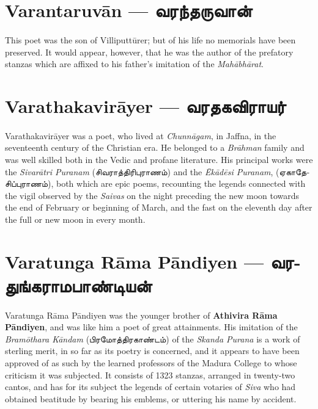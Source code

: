 \documentclass{article}
\newcommand{\TamilText}[1]{\texttamil{#1}}
\newcommand{\TamilBold}[1]{\texttamil{\textbf{#1}}}
\newcommand{\tam}[1]{\TamilText{#1}}
\newcommand{\tambold}[1]{\TamilBold{#1}}
\begin{document}
\section{Varantaruv\={a}n --- \tambold{வரந்தருவான்}}
\paragraph{}
This poet was the son of Villiputt\={u}rer; but of his life no memorials have been preserved. It would appear, however, that he was the author of the prefatory stanzas which are affixed to his father's imitation of the \emph{Mah\={a}bh\={a}rat}.

\section{Varathakavir\={a}yer --- \tambold{வரதகவிராயர்}}
\paragraph{}
Varathakavir\={a}yer was a poet, who lived at \emph{Chunn\={a}gam}, in Jaffna, in the seventeenth century of the Christian era. He belonged to a \emph{Br\={a}hman} family and was well skilled both in the Vedic and profane literature. His principal works were the \emph{Sivar\={a}tri Puranam} (\tam{சிவராத்திரிபுராணம்}) and the \emph{Ēk\={a}d\={e}si Puranam}, (\tam{ஏகாதேசிப்புராணம்}), both which are epic poems, recounting the legends connected with the vigil observed by the \emph{Saivas} on the night preceding the new moon towards the end of February or beginning of March, and the fast on the eleventh day after the full or new moon in every month.

\section{Varatunga R\={a}ma P\={a}ndiyen --- \tambold{வரதுங்கராமபாண்டியன்}}
\paragraph{}
Varatunga R\={a}ma P\={a}ndiyen was the younger brother of \textbf{Athivira R\={a}ma P\={a}ndiyen}, and was like him a poet of great attainments. His imitation of the \emph{Bram\={o}thara K\={a}ndam} (\tam{பிரமோத்திரகாண்டம்}) of the \emph{Skanda Purana} is a work of sterling merit, in so far as its poetry is concerned, and it appears to have been approved of as such by the learned professors of the Madura College to whose criticism it was subjected. It consists of 1323 stanzas, arranged in twenty-two cantos, and has for its subject the legends of certain votaries of \emph{Siva} who had obtained beatitude by bearing his emblems, or uttering his name by accident.
\end{document}
